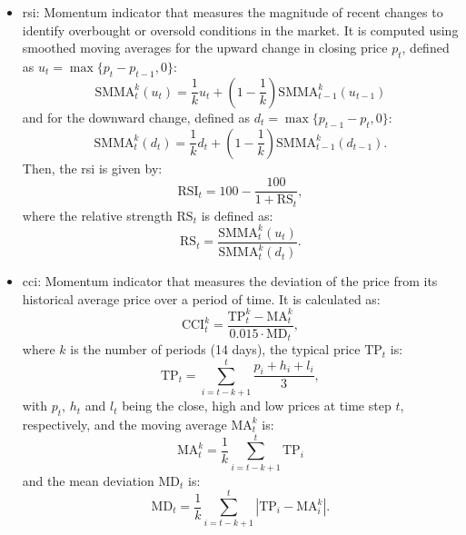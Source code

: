 \begin{itemize}
    \item \acrfull{rsi}: Momentum indicator that measures the magnitude of recent changes to identify overbought or oversold conditions in the market. It is computed using smoothed moving averages for the upward change in closing price $p_t$, defined as $u_t = \max \{p_t - p_{t-1}, 0\}$:
    \begin{equation}
        \text{SMMA}_t^k (u_t) = \frac{1}{k}u_t + \left(1 - \frac{1}{k}\right)\text{SMMA}_{t-1}^k (u_{t-1})
    \end{equation}
    and for the downward change, defined as $d_t = \max \{p_{t-1} - p_t, 0\}$:
    \begin{equation}
        \text{SMMA}_t^k (d_t) = \frac{1}{k}d_t + \left(1 - \frac{1}{k}\right)\text{SMMA}_{t-1}^k (d_{t-1}).
    \end{equation}
    Then, the \acrfull{rsi} is given by:
    \begin{equation}
        \text{RSI}_t = 100 - \frac{100}{1 + \text{RS}_t},
    \end{equation}
    where the relative strength $\text{RS}_t$ is defined as:
    \begin{equation}
        \text{RS}_t = \frac{\text{SMMA}_t^k (u_t)}{\text{SMMA}_t^k (d_t)}.
    \end{equation}
    \item \acrfull{cci}: Momentum indicator that measures the deviation of the price from its historical average price over a period of time. It is calculated as:
    \begin{equation}
        \text{CCI}_t^k = \frac{\text{TP}_t^k - \text{MA}_t^k}{0.015 \cdot \text{MD}_t},
    \end{equation}
    where $k$ is the number of periods (14 days), the typical price $\text{TP}_t$ is:
    \begin{equation}
        \text{TP}_t = \sum_{i=t-k+1}^{t} \frac{p_{i} + h_{i} + l_{i}}{3},
    \end{equation}
    with $p_t$, $h_t$ and $l_t$ being the close, high and low prices at time step $t$, respectively, and the moving average $\text{MA}_t^k$ is:
    \begin{equation}
        \text{MA}_t^k = \frac{1}{k} \sum_{i=t-k+1}^{t} \text{TP}_i
    \end{equation}
    and the mean deviation $\text{MD}_t$ is:
    \begin{equation}
        \text{MD}_t = \frac{1}{k} \sum_{i=t-k+1}^{t} \left| \text{TP}_i - \text{MA}_i^k \right|.
    \end{equation}

\end{itemize}
